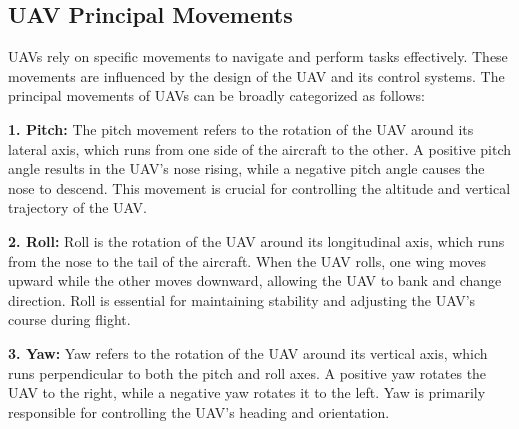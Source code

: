 \vspace{0.5cm}





\subsection{UAV Principal Movements}

UAVs rely on specific movements to navigate and perform tasks effectively. These movements are influenced by the design of the UAV and its control systems. The principal movements of UAVs can be broadly categorized as follows:

\vspace{0.5cm}

\textbf{1. Pitch:} The pitch movement refers to the rotation of the UAV around its lateral axis, which runs from one side of the aircraft to the other. A positive pitch angle results in the UAV's nose rising, while a negative pitch angle causes the nose to descend. This movement is crucial for controlling the altitude and vertical trajectory of the UAV.

\vspace{0.5cm}

\textbf{2. Roll:} Roll is the rotation of the UAV around its longitudinal axis, which runs from the nose to the tail of the aircraft. When the UAV rolls, one wing moves upward while the other moves downward, allowing the UAV to bank and change direction. Roll is essential for maintaining stability and adjusting the UAV's course during flight.

\vspace{0.5cm}

\textbf{3. Yaw:} Yaw refers to the rotation of the UAV around its vertical axis, which runs perpendicular to both the pitch and roll axes. A positive yaw rotates the UAV to the right, while a negative yaw rotates it to the left. Yaw is primarily responsible for controlling the UAV's heading and orientation.


